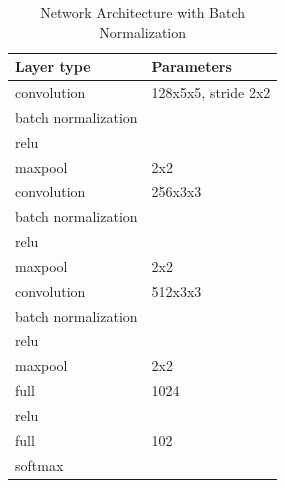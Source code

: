 \documentclass[a4paper, 11pt]{article}
\begin{document}
\begin{table}[!h]
	\begin{center}
		\begin{tabularx}{.5\linewidth}{|X|l|}
			\hline \textbf{Layer type} & \textbf{Parameters} \\ 
			\hline convolution & 128x5x5, stride 2x2 \\ 
			\hline batch normalization & \\
			\hline relu &\\
			\hline maxpool &  2x2\\ 
			\hline convolution & 256x3x3 \\ 
			\hline batch normalization & \\
			\hline relu &\\
			\hline maxpool &  2x2\\ 
			\hline convolution & 512x3x3 \\ 
			\hline batch normalization & \\
			\hline relu &\\
			\hline maxpool &  2x2\\ 
			\hline full &  1024 \\ 
			\hline relu &\\
			\hline full &  102 \\
			\hline softmax & \\
			\hline
		\end{tabularx}
	\end{center}
	\caption{Network Architecture with Batch Normalization}
	\label{tab:bn-arch}
\end{table}
\end{document}
